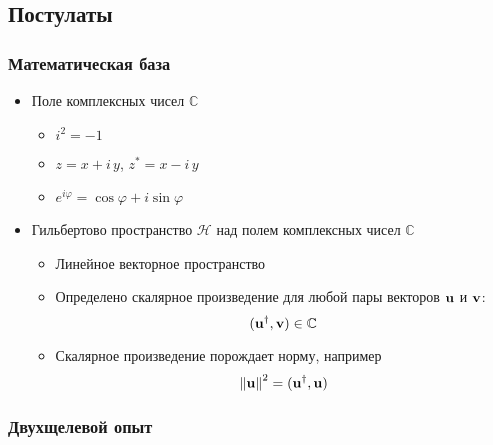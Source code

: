 \subsection{Постулаты}
\begin{frame}
    \frametitle{Математическая база}
    \begin{itemize}[<+->]
    \item
        Поле комплексных чисел $\mathbb{C}$
        \begin{itemize}[<+->]
        \item $i^2 = -1$
        \item $z = x + i\,y$, $z^\ast = x - i\, y$
        \item $e^{i \varphi} = \cos \varphi + i \sin \varphi$
        \end{itemize}
    \item
        Гильбертово пространство $\mathcal{H}$
        над полем комплексных чисел $\mathbb{C}$
        \begin{itemize}[<+->]
        \item Линейное векторное пространство
        \item
            Определено скалярное произведение для любой пары
            векторов $\bf{u}$ и $\bf{v}$:
            $$(\bf{u}^\dagger, \bf{v}) \in \mathbb{C}$$
        \item
            Скалярное произведение порождает норму, например
            $$\left\lVert\bf{u}\right\rVert^2 = (\bf {u}^\dagger, \bf{u})$$
        \end{itemize}
    \end{itemize}
\end{frame}
\begin{frame}
    \frametitle{Двухщелевой опыт}
    \begin{centering}
    
    \end{centering}
\end{frame}
